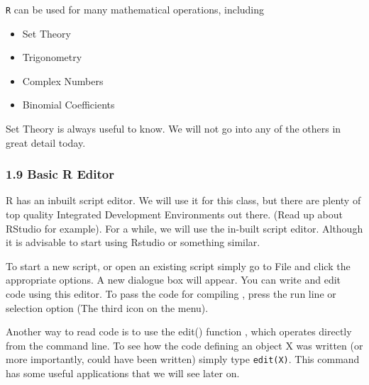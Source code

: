 \documentclass{beamer}
\begin{document}
 \begin{frame}
 	
 	\texttt{R} can be used for many mathematical operations, including
 	
 	\begin{itemize}
 		\item Set Theory
 		\item Trigonometry
 		\item Complex Numbers
 		\item Binomial Coefficients
 	\end{itemize}
 	Set Theory is always useful to know. We will not go into any of the others in great detail today.
 \end{frame}
 \begin{frame}
 	\frametitle{1.9 Basic R Editor}
 	R has an inbuilt script editor. We will use it for this class, but there are plenty of top quality
 	Integrated Development Environments out there. (Read up about RStudio for example).
 	For a while, we will use the in-built script editor. Although it is advisable to start using Rstudio or something similar.
 	
 \end{frame}
 \begin{frame}
 	
 	
 	To start a new script, or open an existing script simply go to File and click the appropriate
 	options. A new dialogue box will appear. You can write and edit code using this editor.
 	To pass the code for compiling , press the run line or selection option (The third icon
 	on the menu).
 	
 \end{frame}
 \begin{frame}
 	
 	Another way to read code is to use the edit() function , which operates directly from the
 	command line. To see how the code defining an object X was written (or more importantly,
 	could have been written) simply type \texttt{edit(X)}. This command has some useful applications
 	that we will see later on.
 	
 \end{frame}
\end{document}

